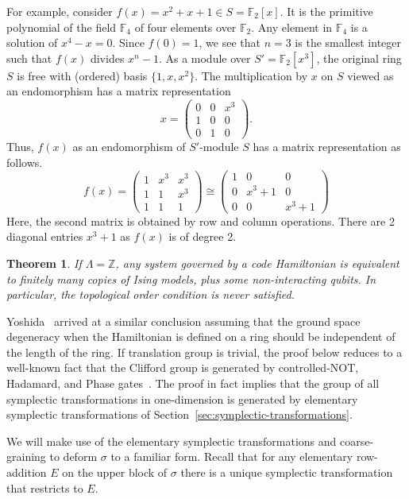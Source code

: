 \documentclass[letterpaper,12pt]{amsart}
\newtheorem{theorem}{Theorem}
\theoremstyle{definition} \newtheorem{defn}{Definition}
\theoremstyle{definition} \newtheorem{rem}{Remark}
\theoremstyle{definition} \newtheorem{example}{Example}
\newcommand{\FF}{\mathbb{F}}
\begin{document}
For example, consider $f(x) = x^2 + x + 1 \in S = \FF_2[x]$.
It is the primitive polynomial of the field $\FF_4$ of four elements over $\FF_2$.
Any element in $\FF_4$ is a solution of $x^4-x=0$.
Since $f(0) = 1$, we see that $n=3$ is the smallest integer such that $f(x)$ divides $x^n-1$.
As a module over $S' = \FF_2[x^3]$, the original ring $S$ is free with (ordered) basis $\{1, x, x^2\}$.
The multiplication by $x$ on $S$ viewed as an endomorphism has a matrix representation
\[
x = 
 \begin{pmatrix}
  0 & 0 & x^3 \\
  1 & 0 & 0   \\
  0 & 1 & 0   
 \end{pmatrix} .
\]
Thus, $f(x)$ as an endomorphism of $S'$-module $S$ has a matrix representation as follows.
\[
 f(x) =
 \begin{pmatrix}
  1 & x^3 & x^3 \\
  1 & 1   & x^3 \\
  1 & 1   & 1  
 \end{pmatrix} 
\cong
 \begin{pmatrix}
  1 & 0      & 0 \\
  0 & x^3 +1 & 0 \\
  0 & 0      & x^3 +1
 \end{pmatrix}
\]
Here, the second matrix is obtained by row and column operations.
There are 2 diagonal entries $x^3+1$ as $f(x)$ is of degree 2.

\begin{theorem}
If $\Lambda = \mathbb{Z}$,
any system governed by a code Hamiltonian
is equivalent to finitely many copies of Ising models,
plus some non-interacting qubits.
In particular, the topological order condition is never satisfied.
\end{theorem}
\noindent
Yoshida~\cite{Yoshida2011Classification} arrived at a similar conclusion
assuming that the ground space degeneracy when the Hamiltonian is defined on a ring 
should be independent of the length of the ring.
If translation group is trivial,
the proof below reduces to a well-known fact that 
the Clifford group is generated by controlled-NOT, Hadamard, and Phase
gates~\cite[Proposition~15.7]{KitaevShenVyalyi2002CQC}.
The proof in fact implies that the group of all symplectic transformations
in one-dimension is generated by elementary symplectic transformations
of Section~\ref{sec:symplectic-transformations}.

We will make use of the elementary symplectic transformations
and coarse-graining to deform $\sigma$ to a familiar form.
Recall that for any elementary row-addition $E$ on the upper block of $\sigma$
there is a unique symplectic transformation that restricts to $E$.
\end{document}
